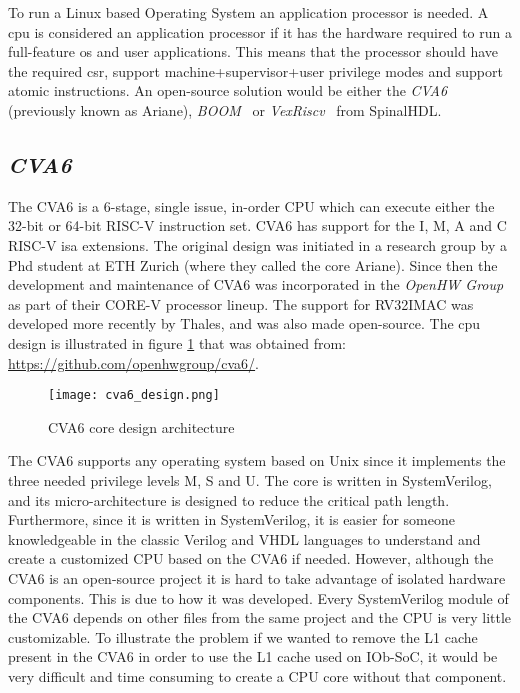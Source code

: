 To run a Linux based Operating System an application processor is needed. A \acrshort{cpu} is considered an application processor if it has the hardware required to run a full-feature \acrfull{os} and user applications. This means that the processor should have the required \acrfull{csr}, support \acrshort{machine}+\acrshort{supervisor}+\acrshort{user} privilege modes and support atomic instructions. An open-source solution would be either the \textit{CVA6}~\cite{zaruba2019cost} (previously known as Ariane), \textit{BOOM}~\cite{zhaosonicboom} or \textit{VexRiscv}~\cite{vexriscv} from SpinalHDL.

\subsection{\textit{CVA6}}
The CVA6 is a 6-stage, single issue, in-order CPU which can execute either the 32-bit or 64-bit RISC-V instruction set. CVA6 has support for the I, M, A and C RISC-V \acrshort{isa} extensions. The original design was initiated in a research group by a Phd student at ETH Zurich (where they called the core Ariane). Since then the development and maintenance of CVA6 was incorporated in the \textit{OpenHW Group} as part of their CORE-V processor lineup. The support for RV32IMAC was developed more recently by Thales, and was also made open-source. The \acrshort{cpu} design is illustrated in figure \ref{fig:cva6_design} that was obtained from: \url{https://github.com/openhwgroup/cva6/}.

\begin{figure}[!h]
    \centering
    \texttt{[image: cva6\_design.png]}
    \caption{CVA6 core design architecture}
    \label{fig:cva6_design}
\end{figure}

The CVA6 supports any operating system based on Unix since it implements the three needed privilege levels M, S and U. The core is written in SystemVerilog, and its micro-architecture is designed to reduce the critical path length. Furthermore, since it is written in SystemVerilog, it is easier for someone knowledgeable in the classic Verilog and VHDL languages to understand and create a customized CPU based on the CVA6 if needed. However, although the CVA6 is an open-source project it is hard to take advantage of isolated hardware components. This is due to how it was developed. Every SystemVerilog module of the CVA6 depends on other files from the same project and the CPU is very little customizable. To illustrate the problem if we wanted to remove the L1 cache present in the CVA6 in order to use the L1 cache used on IOb-SoC, it would be very difficult and time consuming to create a CPU core without that component.

